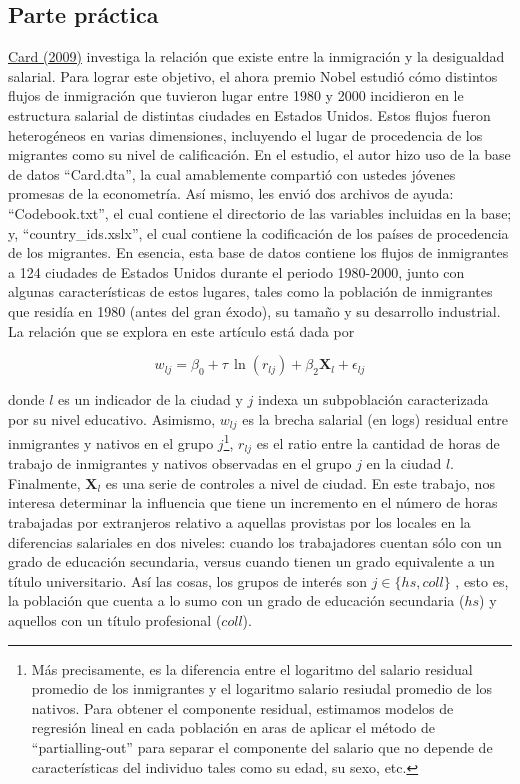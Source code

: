 \documentclass[a4paper, answers, addpoints, 11pt]{exam}
\begin{document}
\subsection*{Parte práctica}
\href{https://davidcard.berkeley.edu/papers/immigration-and-inequality.pdf}{Card (2009)} investiga la relación que existe entre la inmigración y la desigualdad salarial. Para lograr este objetivo, el ahora premio Nobel estudió cómo distintos flujos de inmigración que tuvieron lugar entre 1980 y 2000 incidieron en le estructura salarial de distintas ciudades en Estados Unidos. Estos flujos fueron heterogéneos en varias dimensiones, incluyendo el lugar de procedencia de los migrantes como su nivel de calificación. En el estudio, el autor hizo uso de la base de datos ``Card.dta'', la cual amablemente compartió con ustedes jóvenes promesas de la econometría. Así mismo, les envió dos archivos de ayuda: ``Codebook.txt'', el cual contiene el directorio de las variables incluidas en la base; y, ``country\_ids.xslx'', el cual contiene la codificación de los países de procedencia de los migrantes. En esencia, esta base de datos contiene los flujos de inmigrantes a 124 ciudades de Estados Unidos durante el periodo 1980-2000, junto con algunas características de estos lugares, tales como la población de inmigrantes que residía en 1980 (antes del gran éxodo), su tamaño y su desarrollo industrial. \\

La relación que se explora en este artículo está dada por

$$w_{lj}=\beta_0+\tau \, \ln (r_{lj})+\beta_2 \boldsymbol{X}_l+\epsilon_{lj}$$

donde $l$ es un indicador de la ciudad y $j$ indexa un subpoblación caracterizada por su nivel educativo. Asimismo, $w_{lj}$ es la brecha salarial (en logs) residual entre inmigrantes y nativos en el grupo $j$\footnote{ Más precisamente, es la diferencia entre el logaritmo del salario residual promedio de los inmigrantes y el logaritmo salario resiudal promedio de los nativos. Para obtener el componente residual, estimamos modelos de regresión lineal en cada población en aras de aplicar el método de ``partialling-out'' para separar el componente del salario que no depende de características del individuo tales como su edad, su sexo, etc.}, $r_{lj}$ es el ratio entre la cantidad de horas de trabajo de inmigrantes y nativos  observadas en el grupo $j$ en la ciudad $l$. Finalmente, $\boldsymbol{X}_l$ es una serie de controles a nivel de ciudad. En este trabajo, nos interesa determinar la influencia que tiene un incremento en el número de horas trabajadas por extranjeros relativo a aquellas provistas por los locales en la diferencias salariales en dos niveles: cuando los trabajadores cuentan sólo con un grado de educación secundaria, versus cuando tienen un grado equivalente a un título universitario. Así las cosas, los grupos de interés son $j \in \{hs,coll\}$ , esto es, la población que cuenta a lo sumo con un grado de educación secundaria ($hs$) y aquellos con un título profesional ($coll$).\\
\end{document}

